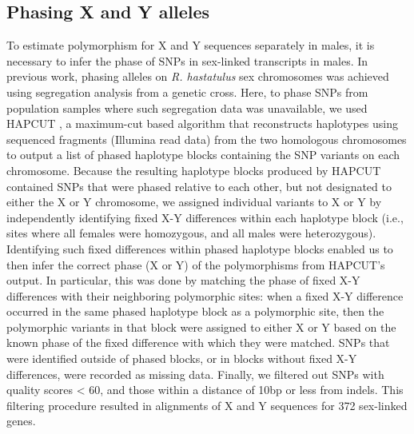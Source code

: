\documentclass[9pt,twocolumn,twoside]{gsajnl}
\begin{document}
\subsection*{Phasing X and Y alleles}
To estimate polymorphism for X and Y sequences separately in males, it is necessary to infer the phase of SNPs in sex-linked transcripts in males. In previous work, phasing alleles on \textit{R. hastatulus} sex chromosomes was achieved using segregation analysis from a genetic cross. Here, to phase SNPs from population samples where such segregation data was unavailable, we used HAPCUT \citep{bansal2008hapcut}, a maximum-cut based algorithm that reconstructs haplotypes using sequenced fragments (Illumina read data) from the two homologous chromosomes to output a list of phased haplotype blocks containing the SNP variants on each chromosome. Because the resulting haplotype blocks produced by HAPCUT contained SNPs that were phased relative to each other, but not designated to either the X or Y chromosome, we assigned individual variants to X or Y by independently identifying fixed X-Y differences within each haplotype block (i.e., sites where all females were homozygous, and all males were heterozygous). Identifying such fixed differences within phased haplotype blocks enabled us to then infer the correct phase (X or Y) of the polymorphisms from HAPCUT’s output. In particular, this was done by matching the phase of fixed X-Y differences with their neighboring polymorphic sites: when a fixed X-Y difference occurred in the same phased haplotype block as a polymorphic site, then the polymorphic variants in that block were assigned to either X or Y based on the known phase of the fixed difference with which they were matched. SNPs that were identified outside of phased blocks, or in blocks without fixed X-Y differences, were recorded as missing data. Finally, we filtered out SNPs with quality scores < 60, and those within a distance of 10bp or less from indels. This filtering procedure resulted in alignments of X and Y sequences for 372 sex-linked genes.
\end{document}
